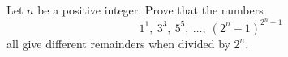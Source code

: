 Let $n$ be a positive integer. Prove that the numbers
$$1^1,\ 3^3,\ 5^5,\ \dots,\ (2^n-1)^{2^n-1}$$
all give different remainders when divided by $2^n$.
